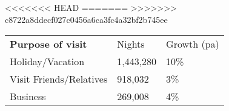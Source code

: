 <<<<<<< HEAD
=======
>>>>>>> c8722a8ddecf027c0456a6ca3fc4a32bf2b745ee
\begin{tabular}[t]{p{4.8cm}>{\hfill}p{1.3cm}>{\hfill}p{1.4cm}}
 \textbf{Purpose of visit} & Nights & Growth (pa) \\ 
 Holiday/Vacation & 1,443,280 & 10\% \\ 
  Visit Friends/Relatives &   918,032 & 3\% \\ 
  Business &   269,008 & 4\% \\ 
  \end{tabular}
